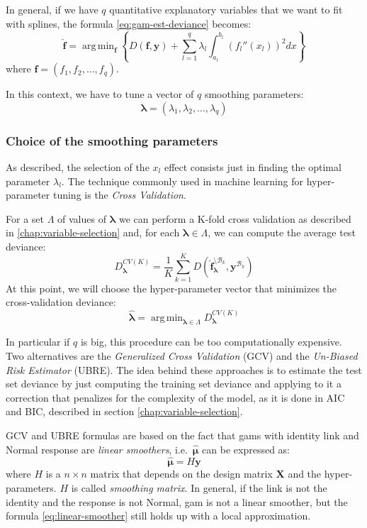 \documentclass[a4paper, twoside, openright, 12pt]{report}
\DeclareMathOperator*{\argmin}{arg\,min}  %
\theoremstyle{definition}
\theoremstyle{definition}
\theoremstyle{definition}
\theoremstyle{remark}
\begin{document}
In general, if we have \(q\) quantitative explanatory variables that we want to fit with splines, the formula \eqref{eq:gam-est-deviance} becomes:
\begin{equation}
\label{eq:gam-est-deviance-multi}
\boldsymbol{\hat{f}} = \argmin_{\boldsymbol{f}}
{\left\{
  D(\boldsymbol{f}, \boldsymbol{y})
    + \sum_{l=1}^{q}{
      \lambda_l \int_{a_l}^{b_l}{\left( f_l''(x_l) \right)^2 dx}
    }
\right\}
} 
\end{equation}
where \(\boldsymbol{f} = \left( f_1, f_2,\dots,f_q \right)\).

In this context, we have to tune a vector of \(q\) smoothing parameters:
\[\boldsymbol{\lambda} = \left( \lambda_1, \lambda_2, \dots, \lambda_q \right)\]

\hypertarget{chap:gam-choice-lambda}{%
\subsubsection{Choice of the smoothing parameters}\label{chap:gam-choice-lambda}}

As described, the selection of the \(x_l\) effect consists just in finding the optimal parameter \(\lambda_l\). The technique commonly used in machine learning for hyper-parameter tuning is the \emph{Cross Validation}.

For a set \(\Lambda\) of values of \(\boldsymbol{\lambda}\) we can perform a K-fold cross validation as described in \ref{chap:variable-selection} and, for each \(\boldsymbol{\lambda}\in\Lambda\), we can compute the average test deviance:
\[
D^{CV(K)}_{\boldsymbol{\lambda}} =
\frac{1}{K} \sum_{k=1}^{K}{
D\left(
\boldsymbol{\hat{f}}_{\boldsymbol{\lambda}}^{\setminus \mathcal{B}_k}, \boldsymbol{y}^{\mathcal{B}_k}
\right)
}
\]
At this point, we will choose the hyper-parameter vector that minimizes the cross-validation deviance:
\[
\hat{\boldsymbol{\lambda}} = \argmin_{\boldsymbol{\lambda}\in\Lambda}{D^{CV(K)}_{\boldsymbol{\lambda}}}
\]

In particular if \(q\) is big, this procedure can be too computationally expensive. Two alternatives are the \emph{Generalized Cross Validation} (GCV) and the \emph{Un-Biased Risk Estimator} (UBRE). The idea behind these approaches is to estimate the test set deviance by just computing the training set deviance and applying to it a correction that penalizes for the complexity of the model, as it is done in AIC and BIC, described in section \ref{chap:variable-selection}.

GCV and UBRE formulas are based on the fact that \ac{gam}s with identity link and Normal response are \emph{linear smoothers}, i.e.~\(\boldsymbol{\hat{\mu}}\) can be expressed as:
\begin{equation}
\label{eq:linear-smoother}
\boldsymbol{\hat{\mu}} = H \boldsymbol{y}
\end{equation}
where \(H\) is a \(n\times n\) matrix that depends on the design matrix \(\boldsymbol{X}\) and the hyper-parameters. \(H\) is called \emph{smoothing matrix}. In general, if the link is not the identity and the response is not Normal, \ac{gam} is not a linear smoother, but the formula \eqref{eq:linear-smoother} still holds up with a local approximation.
\end{document}
